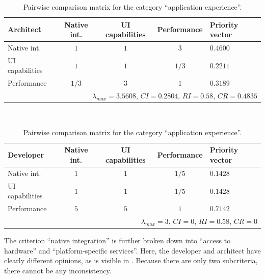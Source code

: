 \begin{table}[h!]
    \centering
    \begin{tabular}{lcccl}
        \hline
        \textbf{Architect}     & Native int. & UI capabilities & Performance & Priority vector \\ 
        \hline
        Native int.            & $1$         & $1$             & $3$         & $0.4600$        \\
        UI capabilities        & $1$         & $1$             & $1/3$       & $0.2211$        \\
        Performance            & $1/3$       & $3$             & $1$         & $0.3189$        \\
        \hline
        \multicolumn{5}{r}{$\lambda_{max} = 3.5608$, $CI = 0.2804$, $RI = 0.58$, $CR = 0.4835$}\\
        \hline
    \end{tabular}
    \\\vspace{1em}
    \begin{tabular}{lcccl}
        \hline
        \textbf{Developer}     & Native int. & UI capabilities & Performance & Priority vector \\ 
        \hline
        Native int.            & $1$         & $1$             & $1/5$       & $0.1428$        \\
        UI capabilities        & $1$         & $1$             & $1/5$       & $0.1428$        \\
        Performance            & $5$         & $5$             & $1$         & $0.7142$        \\
        \hline
        \multicolumn{5}{r}{$\lambda_{max} = 3$, $CI = 0$, $RI = 0.58$, $CR = 0$}               \\
        \hline
    \end{tabular}
    \caption{Pairwise comparison matrix for the category ``application experience''.}
    \label{tab:ae}
\end{table}

The criterion ``native integration'' is further broken down into ``access to hardware'' and ``platform-specific services''. Here, the developer and architect have clearly different opinions, as is visible in . Because there are only two subcriteria, there cannot be any inconsistency. 

